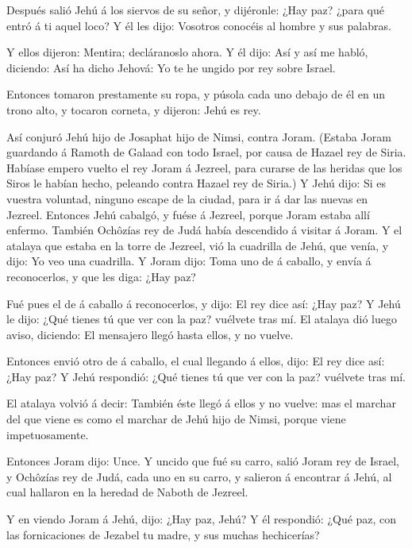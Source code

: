  Después salió Jehú á los siervos de su señor, y dijéronle:
¿Hay paz? ¿para qué entró á ti aquel loco? Y él les dijo: Vosotros
conocéis al hombre y sus palabras.

 Y ellos dijeron: Mentira; decláranoslo ahora. Y él dijo:
Así y así me habló, diciendo: Así ha dicho Jehová: Yo te he ungido por
rey sobre Israel.

 Entonces tomaron prestamente su ropa, y púsola cada uno
debajo de él en un trono alto, y tocaron corneta, y dijeron: Jehú es
rey.

 Así conjuró Jehú hijo de Josaphat hijo de Nimsi, contra
Joram. (Estaba Joram guardando á Ramoth de Galaad con todo Israel, por
causa de Hazael rey de Siria.  Habíase empero vuelto el rey
Joram á Jezreel, para curarse de las heridas que los Siros le habían
hecho, peleando contra Hazael rey de Siria.) Y Jehú dijo: Si es vuestra
voluntad, ninguno escape de la ciudad, para ir á dar las nuevas en
Jezreel.  Entonces Jehú cabalgó, y fuése á Jezreel, porque
Joram estaba allí enfermo. También Ochôzías rey de Judá había descendido
á visitar á Joram.  Y el atalaya que estaba en la torre de
Jezreel, vió la cuadrilla de Jehú, que venía, y dijo: Yo veo una
cuadrilla. Y Joram dijo: Toma uno de á caballo, y envía á reconocerlos,
y que les diga: ¿Hay paz?

 Fué pues el de á caballo á reconocerlos, y dijo: El rey
dice así: ¿Hay paz? Y Jehú le dijo: ¿Qué tienes tú que ver con la paz?
vuélvete tras mí. El atalaya dió luego aviso, diciendo: El mensajero
llegó hasta ellos, y no vuelve.

 Entonces envió otro de á caballo, el cual llegando á
ellos, dijo: El rey dice así: ¿Hay paz? Y Jehú respondió: ¿Qué tienes tú
que ver con la paz? vuélvete tras mí.

 El atalaya volvió á decir: También éste llegó á ellos y no
vuelve: mas el marchar del que viene es como el marchar de Jehú hijo de
Nimsi, porque viene impetuosamente.

 Entonces Joram dijo: Unce. Y uncido que fué su carro,
salió Joram rey de Israel, y Ochôzías rey de Judá, cada uno en su carro,
y salieron á encontrar á Jehú, al cual hallaron en la heredad de Naboth
de Jezreel.

 Y en viendo Joram á Jehú, dijo: ¿Hay paz, Jehú? Y él
respondió: ¿Qué paz, con las fornicaciones de Jezabel tu madre, y sus
muchas hechicerías?

